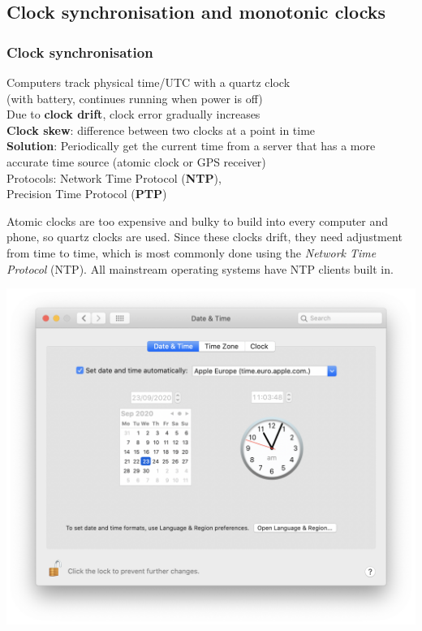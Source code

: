 \newpage
\subsection{Clock synchronisation and monotonic clocks}\label{sec:clock-sync}

\begin{frame}
    \label{s:clock-sync}
    \frametitle{Clock synchronisation}
    Computers track physical time/UTC with a quartz clock\\
    (with battery, continues running when power is off)\\[1em]
    Due to \textbf{clock drift}, clock error gradually increases\\[1em]\pause
    \textbf{Clock skew}: difference between two clocks at a point in time\\[1em]\pause
    \textbf{Solution}: Periodically get the current time from a server that has a more
    accurate time source (atomic clock or GPS receiver)\\[1em]
    Protocols: Network Time Protocol (\textbf{NTP}),\\ Precision Time Protocol (\textbf{PTP})
\end{frame}
\label{l:clock-sync}

Atomic clocks are too expensive and bulky to build into every computer and phone, so quartz clocks are used.
Since these clocks drift, they need adjustment from time to time, which is most commonly done using the \emph{Network Time Protocol} (NTP).
All mainstream operating systems have NTP clients built in.

\begin{frame}[plain]
    \label{s:ntp-config}
    \includegraphics[height=\paperheight]{images/ntp-config.png}
\end{frame}
\label{l:ntp-config}

